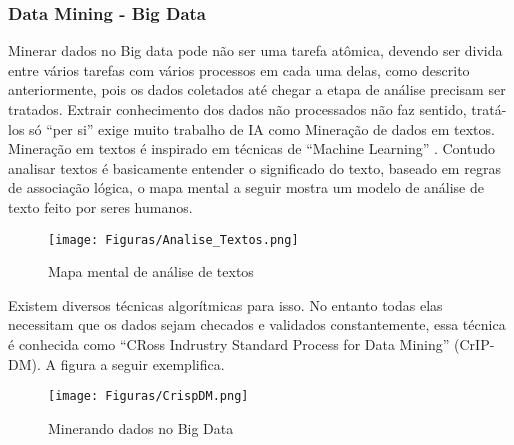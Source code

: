 \documentclass[conference,compsoc]{IEEEtran}
\begin{document}
\subsubsection{Data Mining - Big Data}\label{arte:palavraChave:DataMiningBigData}

Minerar dados no Big data pode não ser uma tarefa atômica, devendo ser divida entre vários tarefas com vários processos em cada uma delas, como descrito anteriormente, pois os dados coletados até chegar a etapa de análise precisam ser tratados. Extrair conhecimento dos dados não processados não faz sentido, tratá-los só ``per si'' exige muito trabalho de IA como Mineração de dados em textos. Mineração em textos é inspirado em técnicas de ``Machine Learning'' \cite{Aranha2006}. Contudo analisar textos é basicamente entender o significado do texto, baseado em regras de associação lógica, o mapa mental a seguir mostra um modelo de análise de texto feito por seres humanos.

\begin{figure}[!ht]
\centering
\caption{Mapa mental de análise de textos}
\flushleft
\texttt{[image: Figuras/Analise\_Textos.png]}
\end{figure}

Existem diversos técnicas algorítmicas para isso. No entanto todas elas necessitam que os dados sejam checados e validados constantemente, essa técnica é conhecida como ``CRoss Indrustry Standard Process for Data Mining'' (CrIP-DM). A figura a seguir exemplifica.

\begin{figure}[!ht]
\centering
\caption{Minerando dados no Big Data}
\flushleft
\texttt{[image: Figuras/CrispDM.png]}
\end{figure}
\end{document}
